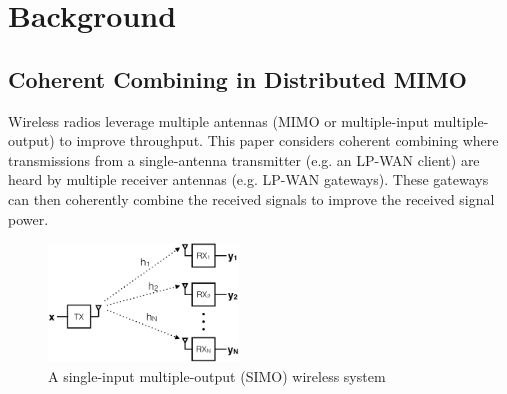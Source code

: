 \section{Background}
\label{sec:background}

\subsection{Coherent Combining in Distributed MIMO}
\label{sec:simo}

Wireless radios leverage multiple antennas (MIMO or multiple-input multiple-output) to improve throughput. This paper considers coherent combining where transmissions from a single-antenna transmitter (e.g. an LP-WAN client) are heard by multiple receiver antennas (e.g. LP-WAN gateways). These gateways can then coherently combine the received signals to improve the received signal power. 



\begin{figure}[!htb]
    \centering
    \includegraphics[width=0.45\textwidth]{figures/SIMO_cropped}
    \caption{A single-input multiple-output (SIMO) wireless system}
    \label{fig:simo}
\end{figure}

